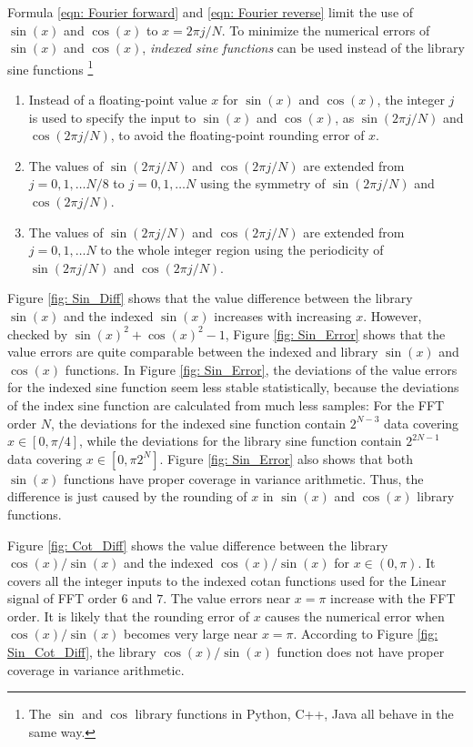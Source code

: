 \documentclass[twoside]{article}
\numberwithin{equation}{section}
\begin{document}
Formula \eqref{eqn: Fourier forward} and \eqref{eqn: Fourier reverse} limit the use of $\sin(x)$ and $\cos(x)$ to $x = 2\pi j/N$.
To minimize the numerical errors of $\sin(x)$ and $\cos(x)$, \emph{indexed sine functions} can be used instead of the library sine functions \footnote{The $\sin$ and $\cos$ library functions in Python, C++, Java all behave in the same way.}
\begin{enumerate}
\item Instead of a floating-point value $x$ for $\sin(x)$ and $\cos(x)$, the integer $j$ is used to specify the input to $\sin(x)$ and $\cos(x)$, as $\sin(2\pi j/N)$ and $\cos(2\pi j/N)$, to avoid the floating-point rounding error of $x$.

\item The values of $\sin(2\pi j/N)$ and $\cos(2\pi j/N)$ are extended from $j = 0,1,\dots N/8$ to $j = 0,1,\dots N$ using the symmetry of $\sin(2\pi j/N)$ and $\cos(2\pi j/N)$.

\item The values of $\sin(2\pi j/N)$ and $\cos(2\pi j/N)$ are extended from $j = 0,1,\dots N$ to the whole integer region using the periodicity of $\sin(2\pi j/N)$ and $\cos(2\pi j/N)$.

\end{enumerate}

Figure \ref{fig: Sin_Diff} shows that the value difference between the library $\sin(x)$ and the indexed $\sin(x)$ increases with increasing $x$.
However, checked by $\sin(x)^2 + \cos(x)^2 - 1$, Figure \ref{fig: Sin_Error} shows that the value errors are quite comparable between  the indexed and library $\sin(x)$ and $\cos(x)$ functions.
In Figure \ref{fig: Sin_Error}, the deviations of the value errors for the indexed sine function seem less stable statistically, because the deviations of the index sine function are calculated from much less samples: For the FFT order $N$, the deviations for the indexed sine function contain $2^{N-3}$ data covering $x \in [0, \pi/4]$, while the deviations for the library sine function contain $2^{2N-1}$ data covering $x \in [0, \pi 2^{N}]$.
Figure \ref{fig: Sin_Error} also shows that both $\sin(x)$ functions have proper coverage in variance arithmetic.
Thus, the difference is just caused by the rounding of $x$ in $\sin(x)$ and $\cos(x)$ library functions.

Figure \ref{fig: Cot_Diff} shows the value difference between the library $\cos(x)/\sin(x)$ and the indexed $\cos(x)/\sin(x)$ for $x \in (0, \pi)$.
It covers all the integer inputs to the indexed cotan functions used for the Linear signal of FFT order $6$ and $7$.
The value errors near $x = \pi$ increase with the FFT order.
It is likely that the rounding error of $x$ causes the numerical error when $\cos(x)/\sin(x)$ becomes very large near $x = \pi$.
According to Figure \ref{fig: Sin_Cot_Diff}, the library $\cos(x)/\sin(x)$ function does not have proper coverage in variance arithmetic.
\end{document}
